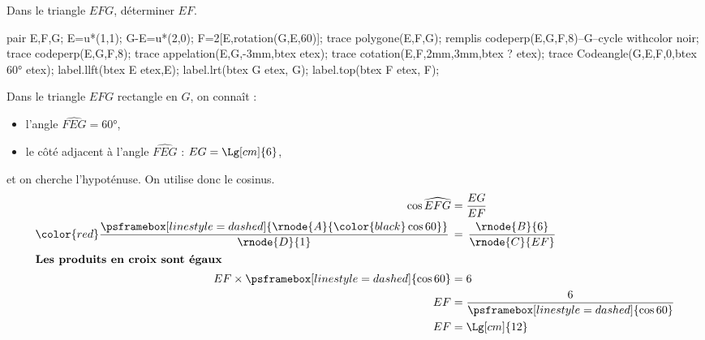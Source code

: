 \begin{methode}
    \exercice    
    Dans le triangle $EFG$, déterminer $EF$.\\
    \begin{Geometrie}[CoinHD={(4u,5u)}]        
        pair E,F,G;
        E=u*(1,1);
        G-E=u*(2,0);
        F=2[E,rotation(G,E,60)];
        trace polygone(E,F,G);
        remplis codeperp(E,G,F,8)--G--cycle withcolor noir;
        trace codeperp(E,G,F,8);
        trace appelation(E,G,-3mm,btex  etex);        
        trace cotation(E,F,2mm,3mm,btex ? etex);        
        trace Codeangle(G,E,F,0,btex \ang{60} etex);
        label.llft(btex E etex,E);
        label.lrt(btex G etex, G);
        label.top(btex F etex, F);
    \end{Geometrie}
    \correction
    Dans le triangle $EFG$ rectangle en $G$, on connaît :
    \begin{itemize}
        \item l'angle $\widehat{FEG}=\ang{60}$,
        \item le côté adjacent à l'angle $\widehat{FEG}$ : $EG=\Lg[cm]{6}$,
    \end{itemize}
    et on cherche l'hypoténuse. On utilise donc le cosinus.
    \begin{align*}
        \cos\widehat{EFG}&=\frac{EG}{EF}\\
        {\color{red}\frac{\psframebox[linestyle=dashed]{\rnode{A}{\color{black}\cos60}}}{\rnode{D}{1}}}\,&=\,\frac{\rnode{B}{6}}{\rnode{C}{EF}}\\
        \intertext{\centering\bf Les produits en croix sont égaux}
        EF\times\psframebox[linestyle=dashed]{\cos60}&=6\\
        EF&=\frac{6}{\psframebox[linestyle=dashed]{\cos60}}\\
        EF&=\Lg[cm]{12}
    \end{align*}
\end{methode}

